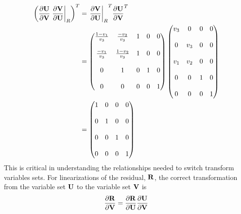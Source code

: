 \documentclass[a4paper]{report}
\begin{document}
\begin{equation}
  \begin{aligned}
    \left( \frac{\partial \mathbf U}{\partial \mathbf V} \left. \frac{\partial \mathbf V}{\partial \mathbf U}\right|_{R} \right)^T &= 
    {\left. \frac{\partial \mathbf V}{\partial \mathbf U}\right|_{R}}^T {\frac{\partial \mathbf U}{\partial \mathbf V}}^T \\ &=
    \begin{pmatrix}
      \frac{1-v_1}{v_3} & \frac{-v_2}{v_3}  & 1 & 0 & 0 \\ \\
      \frac{-v_1}{v_3}  & \frac{1-v_2}{v_3} & 1 & 0 & 0 \\ \\
      0                 & 1                 & 0 & 1 & 0 \\ \\
      0                 & 0                 & 0 & 0 & 1
    \end{pmatrix}
    \begin{pmatrix}
      v_3 & 0   & 0   & 0 \\ \\
      0   & v_3 & 0   & 0 \\ \\
      v_1 & v_2 & 0   & 0 \\ \\
      0   & 0   & 1   & 0 \\ \\
      0   & 0   & 0   & 1 
    \end{pmatrix} \\
    &= 
    \begin{pmatrix}
      1 & 0 & 0 & 0 \\ \\
      0 & 1 & 0 & 0 \\ \\
      0 & 0 & 1 & 0 \\ \\
      0 & 0 & 0 & 1
    \end{pmatrix}
  \end{aligned}
  \label{dvdu-jac-tranpose}
\end{equation}
This is critical in understanding the relationships needed to switch transform
variables sets.  For linearizations of the residual, $\mathbf R$, the correct
transformation from the variable set $\mathbf U$ to the variable set $\mathbf V$ is
\begin{equation}
  \frac{\partial \mathbf R}{\partial \mathbf V} = \frac{\partial \mathbf R}{\partial \mathbf U} \frac{\partial \mathbf U}{\partial \mathbf V}
  \label{r-u-to-v}
\end{equation}
\end{document}
